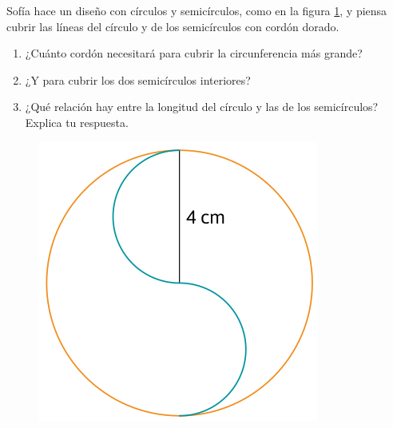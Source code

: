 \documentclass[11pt]{book}
\begin{document}
\begin{enumerate}
        \begin{minipage}[t]{0.7\textwidth}
          \item Sofía hace un diseño con círculos y semicírculos, como en la figura \ref{fig:jinjang}, y piensa
          cubrir las líneas del círculo y de los semicírculos con cordón dorado.
          \begin{enumerate}
            \item ¿Cuánto cordón necesitará para cubrir la circunferencia más grande?\\
            \item ¿Y para cubrir los dos semicírculos interiores?\\
            \item ¿Qué relación hay entre la longitud del círculo y las de los semicírculos? Explica tu respuesta.
          \end{enumerate}
        \end{minipage}\hfill
        \begin{minipage}[t]{0.2\textwidth}
          \begin{figure}[H]
            \centering
            \includegraphics[width=\linewidth]{jinjang.png}
            \label{fig:jinjang}
          \end{figure}
        \end{minipage}



\end{enumerate}
\end{document}

